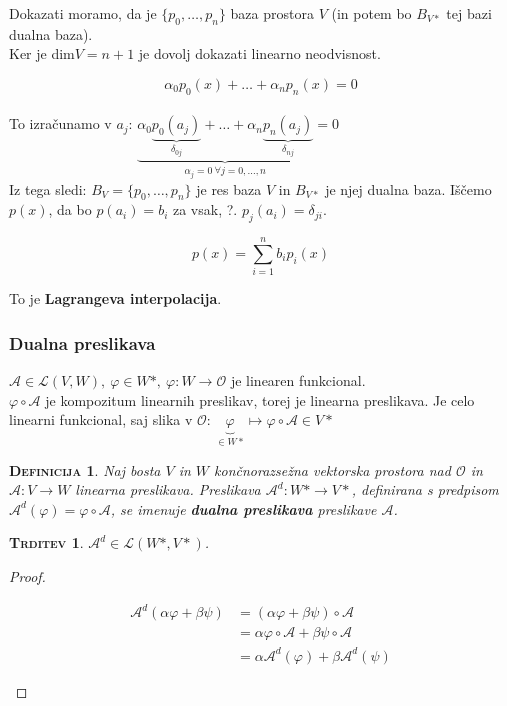 \documentclass[a4paper,12pt]{article}
\newcommand{\A}{\mathcal{A}}
\newcommand{\OO}{\mathcal{O}}
\newcommand{\LL}{\mathcal{L}}
\newtheorem*{trditev}{\textsc{Trditev}}
\newtheorem*{definicija}{\textsc{Definicija}}
\begin{document}
\begin{itemize}
	Dokazati moramo, da je $\{p_0,\ldots,p_n\}$ baza prostora $V$ (in potem bo $B_{V*}$ tej bazi dualna baza). \\

	Ker je dim$V=n+1$ je dovolj dokazati linearno neodvisnost. 

	$$\alpha_0p_0(x)+\ldots+\alpha_np_n(x)=0$$ \\ 

	To izračunamo v $a_j$: $\underbrace{\alpha_0 \underbrace{p_0(a_j)}_{\delta_{0j}}+\ldots+\alpha_n \underbrace{p_n(a_j)}_{\delta_{nj}}}_{\alpha_j=0~\forall j=0,\ldots,n}=0$ \\

	Iz tega sledi: $B_V=\{p_0,\ldots,p_n\}$ je res baza $V$ in $B_{V*}$ je njej dualna baza. Iščemo $p(x)$, da bo $p(a_i)=b_i$ za vsak, ?. $p_j(a_i)=\delta_{ji}$. 

	$$ p(x)=\sum_{i=1}^n b_ip_i(x)$$ 

	To je \textbf{Lagrangeva interpolacija}. 
\end{itemize}

\newpage 

\subsubsection{Dualna preslikava}

$\A \in \LL(V,W),~\varphi\in W*,~\varphi:W\to \OO$ je linearen funkcional. \\

$\varphi \circ \A$ je kompozitum linearnih preslikav, torej je linearna preslikava. Je celo linearni funkcional, saj slika v $\OO$: $\underbrace{\varphi}_{\in W*} \mapsto \varphi \circ \A \in V*$  \\ 

\begin{definicija}
	Naj bosta $V$ in $W$ končnorazsežna vektorska prostora nad $\OO$ in $\A:V\to W$ linearna preslikava. Preslikava $\A^d:W*\to V*$, definirana s predpisom $\A^d(\varphi)=\varphi\circ \A$, se imenuje \textbf{dualna preslikava} preslikave $\A$. \\
\end{definicija}

\begin{trditev}
	$\A^d\in \LL(W*,V*)$.\\
\end{trditev}

\begin{proof} ~
	\begin{center}
	\begin{align*}
		\A^d(\alpha \varphi+\beta \psi) &= (\alpha \varphi + \beta \psi)\circ \A \\
		&= \alpha \varphi \circ \A + \beta \psi \circ \A \\
		&= \alpha \A^d(\varphi)+\beta \A^d(\psi)
	\end{align*}
	\end{center}
\end{proof}
\end{document}
